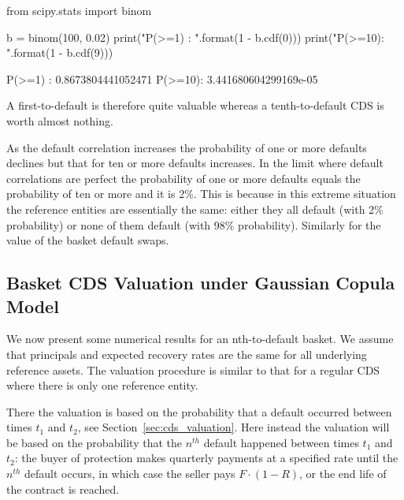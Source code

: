 \begin{ipython}
from scipy.stats import binom

b = binom(100, 0.02)
print("P(>=1) : {}".format(1 - b.cdf(0)))
print("P(>=10): {}".format(1 - b.cdf(9)))
\end{ipython}
\begin{ioutput}
P(>=1) : 0.8673804441052471
P(>=10): 3.441680604299169e-05
\end{ioutput}

A first-to-default is therefore quite valuable whereas a tenth-to-default CDS is worth almost nothing.

As the default correlation increases the probability of one or more defaults declines but that for ten or more defaults increases. In the limit where default correlations are perfect the probability of one or more defaults equals the probability of ten or more and it is 2\%. This is because in this extreme situation the reference entities are essentially the same: either they all default (with 2\% probability) or none of them default (with 98\% probability). Similarly for the value of the basket default swaps.

\subsection{Basket CDS Valuation under Gaussian Copula Model}
\label{basket-cds-valuation-under-market-standard-model}
We now present some numerical results for an nth-to-default basket. We assume that principals and expected recovery rates are the same for all underlying reference assets. The valuation procedure is similar to that for a regular CDS where there is only one reference entity.

There the valuation is based on the probability that a default occurred between times \(t_1\) and \(t_2\), see Section~\ref{sec:cds_valuation}. Here instead the valuation will be based on the probability that the $n^{th}$ default happened between times \(t_1\) and \(t_2\): the buyer of protection makes quarterly payments at a
specified rate until the $n^{th}$ default occurs, in which case the seller pays \(F\cdot(1-R)\), or the end life of the contract is reached. 

